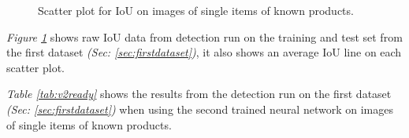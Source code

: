 \begin{figure}[h]
 \hfill
 \caption{Scatter plot for IoU on images of single items of known products.} %
 \label{figure: v2knownproducts}
\end{figure}
\textit{Figure \ref{figure: v2knownproducts}} shows raw IoU data from detection run on the training and test set from the first dataset \textit{(Sec: \ref{sec:firstdataset})}, it also shows an average IoU line on each scatter plot.

\begin{table}[h]
\caption{Detection results when tested on trained data using the second neural network.}
\label{tab:v2ready}
\end{table}
\textit{Table \ref{tab:v2ready}} shows the results from the detection run on the first dataset \textit{(Sec: \ref{sec:firstdataset})} when using the second trained neural network on images of single items of known products.

